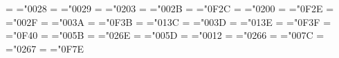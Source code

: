 { \mathchardef\hs@mathcodeXL= ="0028 %
 \mathchardef\hs@mathcodeXLI= ="0029 %
 \mathchardef\hs@mathcodeXLII= ="0203 %
 \mathchardef\hs@mathcodeXLIII= ="002B %
 \mathchardef\hs@mathcodeXLIV= ="0F2C %
 \mathchardef\hs@mathcodeXLV= ="0200 %
 \mathchardef\hs@mathcodeXLVI= ="0F2E %
 \mathchardef\hs@mathcodeXLVII= ="002F %
 \mathchardef\hs@mathcodeLVIII= ="003A %
 \mathchardef\hs@mathcodeLVIX= ="0F3B %
 \mathchardef\hs@mathcodeLX= ="013C %
 \mathchardef\hs@mathcodeLXI= ="003D %
 \mathchardef\hs@mathcodeLXII= ="013E %
 \mathchardef\hs@mathcodeLXIII= ="0F3F %
 \mathchardef\hs@mathcodeLXIV= ="0F40 %
 \mathchardef\hs@mathcodeXCI= ="005B %
 \mathchardef\hs@mathcodeXCII= ="026E %
 \mathchardef\hs@mathcodeXCIII= ="005D %
 \mathchardef\hs@mathcodeXCVI= ="0012 %
 \mathchardef\hs@mathcodeCXXIII= ="0266 %
 \mathchardef\hs@mathcodeCXXIV= ="007C %
 \mathchardef\hs@mathcodeCXXV= ="0267 %
 \mathchardef\hs@mathcodeCXXVI= ="0F7E %
 \relax}

